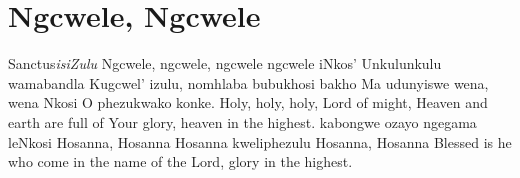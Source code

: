 \starttocol
\chapter{Ngcwele, Ngcwele}
\nexttocol
S{\sc anctus}\hfill{\it isiZulu}
\stoptocol
\starttocol
\startlines
N{\sc gcwele}, ngcwele, ngcwele
ngcwele iNkos'
Unkulunkulu wamabandla
Kugcwel' izulu, nomhlaba bubukhosi bakho
Ma udunyiswe wena, wena Nkosi
O phezukwako konke.
\stoplines
\nexttocol
%
Holy, holy, holy,
Lord of might,
Heaven and earth are full of Your glory, heaven in the highest.
\stoptocol
\starttocol
\startlines
kabongwe ozayo ngegama leNkosi
Hosanna, Hosanna
Hosanna kweliphezulu
Hosanna, Hosanna
\stoplines
\nexttocol
Blessed is he who come in the name of the Lord, glory in the
highest.
\stoptocol
